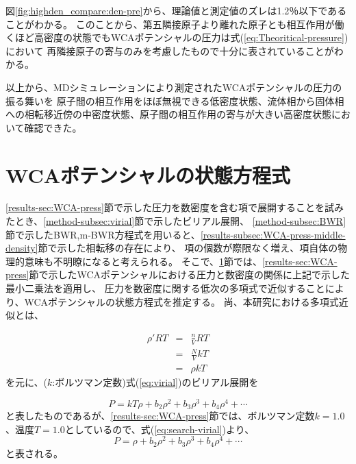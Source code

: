 \documentclass[titlepage]{jsreport}
\begin{document}
{{{図\ref{fig:highden_compare:den-pre}から、理論値と測定値のズレは1.2％以下であることがわかる。
このことから、第五隣接原子より離れた原子とも相互作用が働くほど高密度の状態でもWCAポテンシャルの圧力は式(\ref{eq:Theoritical-pressure})において
再隣接原子の寄与のみを考慮したもので十分に表されていることがわかる。



以上から、MDシミュレーションにより測定されたWCAポテンシャルの圧力の振る舞いを
原子間の相互作用をほぼ無視できる低密度状態、流体相から固体相への相転移近傍の中密度状態、原子間の相互作用の寄与が大きい高密度状態において確認できた。



\section{WCAポテンシャルの状態方程式}\label{results-sec:WCA-equation}
\ref{results-sec:WCA-press}節で示した圧力を数密度を含む項で展開することを試みたとき、\ref{method-subsec:virial}節で示したビリアル展開、
\ref{method-subsec:BWR}節で示したBWR,m-BWR方程式を用いると、\ref{results-subsec:WCA-press-middle-density}節で示した相転移の存在により、
項の個数が際限なく増え、項自体の物理的意味も不明瞭になると考えられる。
そこで、\ref{results-sec:WCA-equation}節では、\ref{results-sec:WCA-press}節で示したWCAポテンシャルにおける圧力と数密度の関係に上記で示した最小二乗法を適用し、
圧力を数密度に関する低次の多項式で近似することにより、WCAポテンシャルの状態方程式を推定する。
尚、本研究における多項式近似とは、

\large
\begin{eqnarray}
    {{\rho}'}RT \nonumber &=& \frac{n}{V}RT \nonumber \\ 
    &=& \frac{N}{V}kT \nonumber \\ 
    &=& {\rho}kT \nonumber
\end{eqnarray}
\normalsize
を元に、($k$:ボルツマン定数)式(\ref{eq:virial})のビリアル展開を

\large
\begin{equation}
    P=kT\rho+b_2\rho^2+b_3\rho^3+b_4\rho^4+\cdots\label{eq:search-virial}
\end{equation}
\normalsize
と表したものであるが、\ref{results-sec:WCA-press}節では、ボルツマン定数$k=1.0$、温度$T=1.0$としているので、式(\ref{eq:search-virial})より、
\large
\begin{equation}
    P=\rho+b_2\rho^2+b_3\rho^3+b_4\rho^4+\cdots\label{eq:modified-search-virial}
\end{equation}
\normalsize
と表される。

}}}
\end{document}
